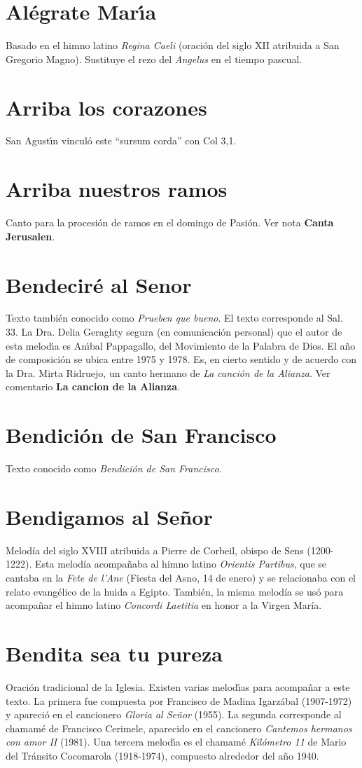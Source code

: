 \documentclass[landscape,12pt]{report}
\begin{document}
\section*{\small Al\'egrate Mar\'\i a} \noindent\footnotesize Basado en el himno latino \textit{Regina Caeli} (oraci\'on del siglo XII atribuida a San Gregorio Magno). Sustituye el rezo del \textit{Angelus} en el tiempo pascual. 
\section*{\small Arriba los corazones} \noindent\footnotesize San Agust\'\i n vincul\'o este ``sursum corda'' con Col 3,1.
\section*{\small Arriba nuestros ramos} \noindent\footnotesize Canto para la procesi\'on de ramos en el domingo de Pasi\'on. Ver nota \textbf{Canta Jerusalen}.
\section*{\small Bendeciré al Senor} \noindent\footnotesize Texto tambi\'en conocido como \textit{Prueben que bueno}. El texto corresponde al Sal. 33. La Dra. Delia Geraghty segura (en comunicaci\'on personal) que el autor de esta melod\'\i a es An\'\i bal Pappagallo, del Movimiento de la Palabra de Dios. El a\~no de composici\'on se ubica entre 1975 y 1978. Es, en cierto sentido y de acuerdo con la Dra. Mirta Ridruejo, un canto hermano de \textit{La canci\'on de la Alianza}. Ver comentario \textbf{La cancion de la Alianza}.   
\section*{\small Bendici\'on de San Francisco} \noindent Texto conocido como \textit{Bendici\'on de San Francisco}.
\section*{\small Bendigamos al Señor} \noindent Melodía del siglo XVIII atribuida a Pierre de Corbeil, obispo de Sens (1200-1222). Esta melodía acompañaba al himno latino \textit{Orientis Partibus}, que se cantaba en la \emph{Fete de l’Ane} (Fiesta del Asno, 14 de enero) y se relacionaba con el relato evangélico de la huida a Egipto. También, la misma melodía se usó para acompañar el himno latino \emph{Concordi Laetitia} en honor a la Virgen María. 
\section*{\small Bendita sea tu pureza} \noindent\footnotesize Oraci\'on tradicional de la Iglesia. Existen varias melod\'\i as para acompa\~nar a este texto. La primera fue compuesta por Francisco de Madina Igarz\'abal (1907-1972) y apareci\'o en el cancionero \emph{Gloria al Se\~nor} (1955). La segunda corresponde al chamam\'e de Francisco Cerimele, aparecido en el cancionero \emph{Cantemos hermanos con amor II} (1981). Una tercera melod\'\i a es el chamam\'e \emph{Kil\'ometro 11} de Mario del Tr\'ansito Cocomarola (1918-1974), compuesto alrededor del a\~no 1940.
\end{document}

